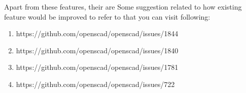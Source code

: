 Apart from these features, their are Some suggestion related to how existing feature would be improved to refer to that you can visit following:

\begin{enumerate}
    \item https://github.com/openscad/openscad/issues/1844
    \item https://github.com/openscad/openscad/issues/1840
    \item https://github.com/openscad/openscad/issues/1781
    \item https://github.com/openscad/openscad/issues/722
\end{enumerate}